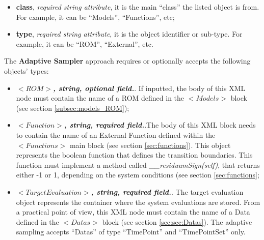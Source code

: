 \begin{itemize}
   \begin{itemize}
     \item \textbf{class}, \textit{required string attribute}, it is the main ``class'' the listed object is from. For example, it can be ``Models'', ``Functions'', etc;
     \item \textbf{type},  \textit{required string attribute}, it is the object identifier or sub-type. For example, it can be ``ROM'', ``External'', etc.
    \end{itemize}
The \textbf{Adaptive Sampler} approach requires or optionally accepts the following objects' types:
   \begin{itemize}
     \item $<ROM>$\textbf{\textit{, string, optional  field.}}. If inputted, the body of this XML node must contain the name of a ROM defined in the $<Models>$ block (see section \ref{subsec:models_ROM});
       \item $<Function>$\textbf{\textit{, string, required field.}}.The body of this XML block needs to contain the name of an External Function defined within the $<Functions>$ main block (see section \ref{sec:functions}). This object represents the boolean function that defines the transition boundaries. This function must implement a method called \textit{\_\_residuumSign(self)}, that returns either -1 or 1, depending on the system conditions (see section \ref{sec:functions};
        \item $<TargetEvaluation>$\textbf{\textit{, string, required field.}}. The target evaluation object represents the container where the system evaluations are stored. From a practical point of view, this XML node must contain the name of a Data defined in the $<Datas>$ block (see section \ref{sec:sec:Datas}). The adaptive sampling accepts ``Datas'' of type ``TimePoint''  and ``TimePointSet'' only.
    \end{itemize}

\end{itemize}



